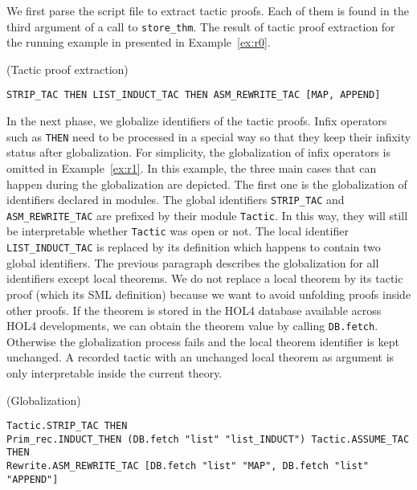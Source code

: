 \documentclass[runningheads,a4paper,draft]{svjour3}
\def\holfour{\textsf{HOL4}\xspace}
\def\sml{\textsf{SML}\xspace}
\begin{document}
We first parse the script file to extract tactic proofs. Each of them is found
in
the third argument of a call to \texttt{store\_thm}. The result of tactic proof
extraction for the running example in presented in Example~\ref{ex:r0}.

\begin{example}\label{ex:r0}(Tactic proof extraction)
\small
\begin{lstlisting}[language=SMLSmall]
STRIP_TAC THEN LIST_INDUCT_TAC THEN ASM_REWRITE_TAC [MAP, APPEND]
\end{lstlisting}
\end{example}

In the next phase, we globalize identifiers of the tactic proofs.
Infix operators such as \texttt{THEN} need to be processed in a special way so
that they keep their infixity status after globalization. For simplicity,
the
globalization of infix operators is omitted in Example~\ref{ex:r1}.
In this example, the three main cases that can happen during the globalization
are depicted. The first one is the globalization of identifiers declared in
modules. The global identifiers \texttt{STRIP\_TAC} and
\texttt{ASM\_REWRITE\_TAC} are prefixed by their module \texttt{Tactic}. In
this way, they will still be interpretable whether \texttt{Tactic} was open or
not. The local identifier \texttt{LIST\_INDUCT\_TAC} is replaced by its
definition which happens to contain two global identifiers.
The previous paragraph describes the globalization for all identifiers except
local theorems.  We do not replace a local
theorem by its tactic proof (which its \sml definition) because we want to
avoid unfolding proofs inside other proofs.
If the theorem is stored in the \holfour database available across \holfour
developments, we can obtain the theorem value by calling \texttt{DB.fetch}.
Otherwise the globalization process fails and the local theorem identifier is
kept unchanged. A recorded tactic with an unchanged local theorem as argument
is only interpretable inside the current theory.

\begin{example}\label{ex:r1} (Globalization)
\begin{lstlisting}[language=SMLSmall]
Tactic.STRIP_TAC THEN
Prim_rec.INDUCT_THEN (DB.fetch "list" "list_INDUCT") Tactic.ASSUME_TAC THEN
Rewrite.ASM_REWRITE_TAC [DB.fetch "list" "MAP", DB.fetch "list" "APPEND"]
\end{lstlisting}
\end{example}
\end{document}
